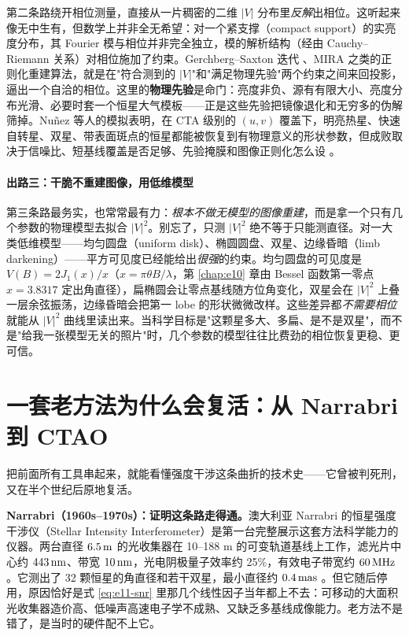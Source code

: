 第二条路绕开相位测量，直接从一片稠密的二维 \(|V|\) 分布里\emph{反解}出相位。这听起来像无中生有，但数学上并非全无希望：对一个紧支撑（compact support）的实亮度分布，其 Fourier 模与相位并非完全独立，模的解析结构（经由 Cauchy--Riemann 关系）对相位施加了约束。Gerchberg--Saxton 迭代 \citep{1966JOSA...56..441G}、MIRA 之类的正则化重建算法，就是在"符合测到的 \(|V|\)"和"满足物理先验"两个约束之间来回投影，逼出一个自洽的相位。这里的\textbf{物理先验}是命门：亮度非负、源有有限大小、亮度分布光滑、必要时套一个恒星大气模板——正是这些先验把镜像退化和无穷多的伪解筛掉。Nuñez 等人的模拟表明，在 CTA 级别的 \((u,v)\) 覆盖下，明亮热星、快速自转星、双星、带表面斑点的恒星都能被恢复到有物理意义的形状参数，但成败取决于信噪比、短基线覆盖是否足够、先验掩膜和图像正则化怎么设 \citep{2012MNRAS.419..172N,2012MNRAS.424.1006N,2014SPIE.9146E..0ZD}。

\paragraph{出路三：干脆不重建图像，用低维模型}
\label{sec:e11-low-dim}

第三条路最务实，也常常最有力：\emph{根本不做无模型的图像重建}，而是拿一个只有几个参数的物理模型去拟合 \(|V|^2\)。别忘了，只测 \(|V|^2\) 绝不等于只能测直径。对一大类低维模型——均匀圆盘（uniform disk）、椭圆圆盘、双星、边缘昏暗（limb darkening）——平方可见度已经能给出\emph{很强}的约束。均匀圆盘的可见度是 \(V(B)=2J_1(x)/x\)（\(x=\pi\theta B/\lambda\)，第 \ref{chap:e10} 章由 Bessel 函数第一零点 \(x=3.8317\) 定出角直径），扁椭圆会让零点基线随方位角变化，双星会在 \(|V|^2\) 上叠一层余弦振荡，边缘昏暗会把第一 lobe 的形状微微改样。这些差异都\emph{不需要相位}就能从 \(|V|^2\) 曲线里读出来。当科学目标是"这颗星多大、多扁、是不是双星"，而不是"给我一张模型无关的照片"时，几个参数的模型往往比费劲的相位恢复更稳、更可信。

\section{一套老方法为什么会复活：从 Narrabri 到 CTAO}
\label{sec:e11-history}

把前面所有工具串起来，就能看懂强度干涉这条曲折的技术史——它曾被判死刑，又在半个世纪后原地复活。

\textbf{Narrabri（1960s--1970s）：证明这条路走得通。}澳大利亚 Narrabri 的恒星强度干涉仪（Stellar Intensity Interferometer）是第一台完整展示这套方法科学能力的仪器。两台直径 \(6.5\,{\rm m}\) 的光收集器在 10--188 m 的可变轨道基线上工作，滤光片中心约 \(443\,{\rm nm}\)、带宽 \(10\,{\rm nm}\)，光电阴极量子效率约 25\%，有效电子带宽约 \(60\,{\rm MHz}\)。它测出了 32 颗恒星的角直径和若干双星，最小直径约 \(0.4\,{\rm mas}\) \citep{1967MNRAS.137..375H,1967MNRAS.137..393H,1974MNRAS.167..121H,1974iiia.book.....H}。但它随后停用，原因恰好是式 \eqref{eq:e11-snr} 里那几个线性因子当年都上不去：可移动的大面积光收集器造价高、低噪声高速电子学不成熟、又缺乏多基线成像能力。老方法不是错了，是当时的硬件配不上它。

